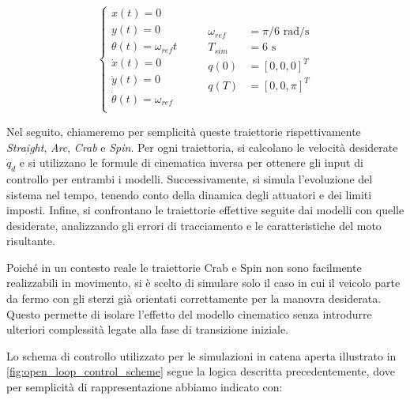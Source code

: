 \begin{itemize}
          \begin{equation}
              \begin{cases}
                  x(t) = 0                       \\
                  y(t) = 0                       \\
                  \theta(t) = \omega_{ref} t     \\
                  \dot{x}(t) = 0                 \\
                  \dot{y}(t) = 0                 \\
                  \dot{\theta}(t) = \omega_{ref} \\
              \end{cases}\qquad
              \begin{aligned}
                  \omega_{ref} & = \pi/6 \text{ rad/s} \\
                  T_{sim}      & = 6 \text{ s}         \\
                  q(0)         & = [0, 0, 0]^T         \\
                  q(T)         & = [0, 0, \pi]^T
              \end{aligned}
          \end{equation}
\end{itemize}
Nel seguito, chiameremo per semplicità queste traiettorie rispettivamente \textit{Straight}, \textit{Arc}, \textit{Crab} e \textit{Spin}.
Per ogni traiettoria, si calcolano le velocità desiderate $\dot{q}_d$ e si utilizzano le formule di cinematica inversa per ottenere gli input di controllo per entrambi i modelli. Successivamente, si simula l'evoluzione del sistema nel tempo, tenendo conto della dinamica degli attuatori e dei limiti imposti. Infine, si confrontano le traiettorie effettive seguite dai modelli con quelle desiderate, analizzando gli errori di tracciamento e le caratteristiche del moto risultante.
\begin{note}
    Poiché in un contesto reale le traiettorie Crab e Spin non sono facilmente realizzabili in movimento, si è scelto di simulare solo il caso in cui il veicolo parte da fermo con gli sterzi già orientati correttamente per la manovra desiderata. Questo permette di isolare l'effetto del modello cinematico senza introdurre ulteriori complessità legate alla fase di transizione iniziale.
\end{note}
Lo schema di controllo utilizzato per le simulazioni in catena aperta illustrato in \cref{fig:open_loop_control_scheme} segue la logica descritta precedentemente, dove per semplicità di rappresentazione abbiamo indicato con:
